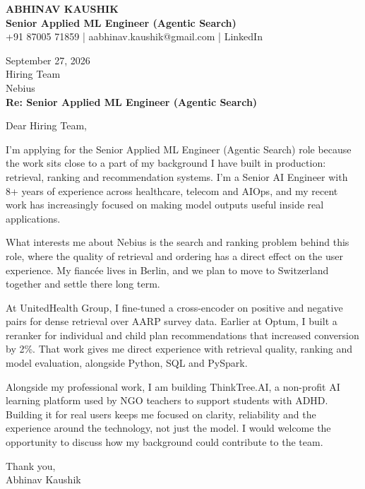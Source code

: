 \documentclass[10pt,a4paper]{article}
\begin{document}
\begin{center}
{\Large\bfseries ABHINAV KAUSHIK}\\[2pt]
{\bfseries Senior Applied ML Engineer (Agentic Search)}\\[2pt]
+91 87005 71859 \quad | \quad aabhinav.kaushik@gmail.com \quad | \quad LinkedIn
\end{center}
\vspace{8pt}
September 27, 2026\\[6pt]
Hiring Team\\
Nebius\\[4pt]
\textbf{Re: Senior Applied ML Engineer (Agentic Search)}

Dear Hiring Team,

I’m applying for the Senior Applied ML Engineer (Agentic Search) role because the work sits close to a part of my background I have built in production: retrieval, ranking and recommendation systems. I’m a Senior AI Engineer with 8+ years of experience across healthcare, telecom and AIOps, and my recent work has increasingly focused on making model outputs useful inside real applications.

What interests me about Nebius is the search and ranking problem behind this role, where the quality of retrieval and ordering has a direct effect on the user experience. My fiancée lives in Berlin, and we plan to move to Switzerland together and settle there long term.

At UnitedHealth Group, I fine-tuned a cross-encoder on positive and negative pairs for dense retrieval over AARP survey data. Earlier at Optum, I built a reranker for individual and child plan recommendations that increased conversion by 2\%. That work gives me direct experience with retrieval quality, ranking and model evaluation, alongside Python, SQL and PySpark.

Alongside my professional work, I am building ThinkTree.AI, a non-profit AI learning platform used by NGO teachers to support students with ADHD. Building it for real users keeps me focused on clarity, reliability and the experience around the technology, not just the model. I would welcome the opportunity to discuss how my background could contribute to the team.

Thank you,\\
Abhinav Kaushik
\end{document}
